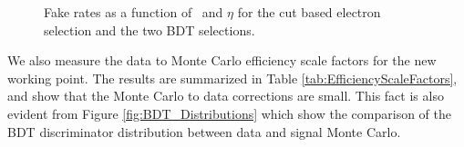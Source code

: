 \documentclass{cmspaper}
\begin{document}
\begin{figure}[!htbp]
\begin{center}
\caption{Fake rates as a function of \pt\ and $\eta$ for the cut based electron selection and the two BDT selections.}
\label{fig:FakeRates}
\end{center}
\end{figure}

We also measure the data to Monte Carlo efficiency scale factors for the new working point. The results are summarized in Table \ref{tab:EfficiencyScaleFactors}, and show that the Monte Carlo to data corrections are small. This fact is also evident from Figure \ref{fig:BDT_Distributions} which show the comparison of the BDT discriminator distribution between data and signal Monte Carlo.
\end{document}
